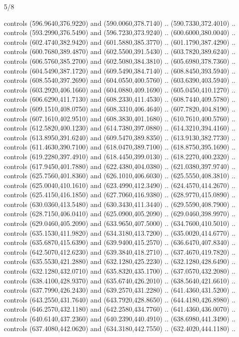 \begin{flagdescription}{5/8}
\begin{scope}[shift={(m)}]
\begin{scope}[scale=\flagwidth/220,y=0.1mm, x=0.1mm, yscale=-1,shift={(-596,-360)}]
\begin{scope}[line width=0.381\lw]
\begin{scope}[draw=black]
  controls (596.9640,376.9220) and (590.0060,378.7140) .. (590.7330,372.4010) ..
  controls (593.2990,376.5490) and (596.7230,373.9240) .. (600.6000,380.0040) ..
  controls (602.4740,382.9420) and (601.5880,385.3770) .. (601.1790,387.4290) ..
  controls (600.7680,389.4870) and (602.5500,391.5430) .. (603.7820,389.6240) ..
  controls (606.5760,385.2700) and (602.5080,384.3810) .. (605.6980,378.7360) ..
  controls (604.5490,387.1720) and (609.5490,384.7140) .. (608.8450,393.5940) ..
  controls (608.5540,397.2690) and (604.0550,400.5760) .. (603.6390,403.5940) ..
  controls (603.2920,406.1660) and (604.0880,409.1690) .. (605.0450,410.1270) ..
  controls (606.6290,411.7130) and (608.2330,411.4530) .. (608.7440,409.5780) ..
  controls (609.1510,408.0750) and (608.3310,406.4640) .. (607.7820,404.8190) ..
  controls (607.1610,402.9510) and (608.3830,401.1680) .. (610.7610,400.5760) ..
  controls (612.5820,400.1230) and (614.7380,397.0880) .. (614.3210,394.4160) ..
  controls (613.8950,391.6240) and (609.5470,389.8350) .. (613.9130,382.7730) ..
  controls (611.4630,390.7100) and (618.0470,389.7100) .. (618.8750,395.1690) ..
  controls (619.2280,397.4910) and (618.4450,399.0130) .. (618.2270,400.2320) ..
  controls (617.9450,401.7880) and (622.4380,404.0380) .. (621.0380,397.9740) ..
  controls (625.7560,401.8360) and (626.1010,406.6030) .. (625.5550,408.3810) ..
  controls (625.0040,410.1610) and (623.4990,412.3490) .. (624.4570,414.2670) ..
  controls (625.4150,416.1850) and (627.7060,416.9380) .. (628.9770,415.0890) ..
  controls (630.0360,413.5480) and (630.3430,411.3440) .. (629.5590,408.7900) ..
  controls (628.7150,406.0410) and (625.0900,405.2090) .. (629.0460,398.9970) ..
  controls (629.0460,405.2090) and (633.9650,407.5000) .. (634.7600,410.5010) ..
  controls (635.1530,411.9820) and (634.3180,413.7200) .. (635.0020,414.6770) ..
  controls (635.6870,415.6390) and (639.9400,415.2570) .. (636.6470,407.8340) ..
  controls (642.5070,412.6230) and (639.3840,418.2710) .. (637.4670,419.7820) ..
  controls (635.5530,421.2880) and (632.1280,425.2230) .. (632.1280,428.6490) ..
  controls (632.1280,432.0710) and (635.8320,435.1700) .. (637.0570,432.2080) ..
  controls (638.4100,428.9370) and (635.6740,426.2010) .. (638.5640,421.6610) ..
  controls (637.7990,426.2430) and (639.2570,431.2280) .. (641.4360,431.5200) ..
  controls (643.2550,431.7640) and (643.7920,428.8650) .. (644.4180,426.8980) ..
  controls (646.2570,432.1180) and (642.2580,434.7760) .. (641.4360,436.0070) ..
  controls (640.6140,437.2360) and (640.2390,440.4910) .. (638.6980,441.3490) ..
  controls (637.4080,442.0620) and (634.3180,442.7550) .. (632.4020,444.1180) ..

\end{scope}
\end{scope}
\end{scope}
\end{scope}
\end{flagdescription}
